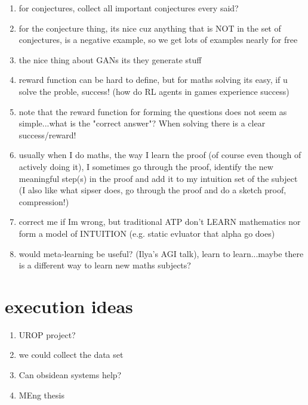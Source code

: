 \documentclass[11pt]{article}
\begin{document}
\begin{enumerate}
\item for conjectures, collect all important conjectures every said?
\item for the conjecture thing, its nice cuz anything that is NOT in the set of conjectures, is a negative example, so we get lots of examples nearly for free
\item the nice thing about GANs its they generate stuff
\item reward function can be hard to define, but for maths solving its easy, if u solve the proble, success! (how do RL agents in games experience success)
\item note that the reward function for forming the questions does not seem as simple...what is the "correct answer"? When solving there is a clear success/reward!
\item usually when I do maths, the way I learn the proof (of course even though of actively doing it), I sometimes go through the proof, identify the new meaningful step(s) in the proof and add it to my intuition set of the subject (I also like what sipser does, go through the proof and do a sketch proof, compression!)
\item correct me if Im wrong, but traditional ATP don't LEARN mathematics nor form a model of INTUITION (e.g. static evluator that alpha go does)
\item would meta-learning be useful? (Ilya's AGI talk), learn to learn...maybe there is a different way to learn new maths subjects?
\end{enumerate}

\section{execution ideas}

\begin{enumerate}
\item UROP project?
\item we could collect the data set
\item Can obsidean systems help?
\item MEng thesis
\end{enumerate}

\printbibliography
\end{document}
